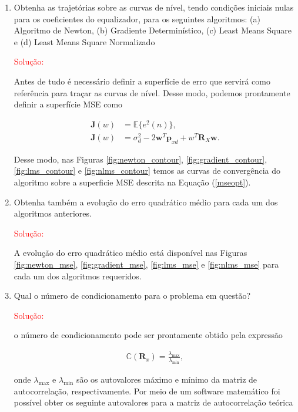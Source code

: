 \documentclass[a4paper,10pt]{article}
\begin{document}
\begin{enumerate}
\begin{enumerate}
					\newpage
					\item Obtenha as trajetórias sobre as curvas de nível, tendo condições iniciais nulas para os coeﬁcientes do equalizador, para os seguintes algoritmos: (a) Algoritmo de Newton, (b) Gradiente Determinístico, (c) Least Means Square e (d) Least Means Square Normalizado
						
						\textcolor{red}{Solução:}
						
						Antes de tudo é necessário definir a superfície de erro que servirá como referência para traçar as curvas de nível. Desse modo, podemos prontamente
						definir a superfície MSE como
						
						\begin{align}
							\mathbf{J}(w) &= \mathbb{E}\{e^{2}(n)\}, \\
							\mathbf{J}(w) &= \sigma^{2}_{d} - 2\mathbf{w}^{T}\mathbf{p}_{xd} + w^{T}\mathbf{R}_{X}\mathbf{w}. \label{mseopt}  
						\end{align}
						
						Desse modo, nas Figuras \ref{fig:newton_contour}, \ref{fig:gradient_contour}, \ref{fig:lms_contour} e \ref{fig:nlms_contour} temos as curvas de convergência do algoritmo sobre a superficie MSE descrita na Equação (\ref{mseopt}). 

					\item Obtenha também a evolução do erro quadrático médio para cada um dos algoritmos anteriores.
						
						\textcolor{red}{Solução:}

						A evolução do erro quadrático médio está disponível nas Figuras \ref{fig:newton_mse}, \ref{fig:gradient_mse}, \ref{fig:lms_mse} e \ref{fig:nlms_mse} para cada um dos algoritmos requeridos.
					
					\item Qual o número de condicionamento para o problema em questão?
					
						\textcolor{red}{Solução:}
						
						o número de condicionamento pode ser prontamente obtido pela expressão

						\begin{align}
							\mathbb{C} (\mathbf{R}_{x}) = \frac{\lambda_{\text{max}}}{\lambda_{\text{min}}},
						\end{align}
					
						onde $\lambda_{\text{max}}$ e $\lambda_{\text{min}}$ são os autovalores máximo e mínimo da matriz de autocorrelação, respectivamente. Por meio de um software
						matemático foi possível obter os seguinte autovalores para a matriz de autocorrelação teórica


\end{enumerate}
\end{enumerate}
\end{document}
